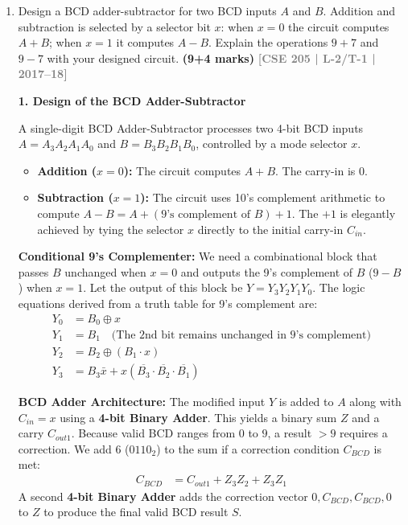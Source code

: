 \documentclass[12pt,a3paper]{article}
\newcommand{\yr}[1]{\hfill\textcolor{gray}{\small\textbf{[#1]}}}
\newcommand{\mk}[1]{\textcolor{orange!70!black}{\small\textbf{(#1 marks)}}}
\begin{document}
\begin{enumerate}
\item Design a BCD adder-subtractor for two BCD inputs $A$ and $B$. Addition and subtraction is selected by a selector bit $x$: when $x=0$ the circuit computes $A+B$; when $x=1$ it computes $A-B$. Explain the operations $9+7$ and $9-7$ with your designed circuit.
\mk{9+4} \yr{CSE 205 | L-2/T-1 | 2017--18}

\begin{tcolorbox}[enhanced,breakable,ansbox,colback=cD!4,colframe=cD,boxrule=0.8pt,arc=5pt,title={\textbf{Answer}},fonttitle=\bfseries\color{white},colbacktitle=cD]

\textbf{\textcolor{cD}{1. Design of the BCD Adder-Subtractor}}

A single-digit BCD Adder-Subtractor processes two 4-bit BCD inputs $A = A_3A_2A_1A_0$ and $B = B_3B_2B_1B_0$, controlled by a mode selector $x$. 
\begin{itemize}
    \item \textbf{Addition ($x = 0$):} The circuit computes $A + B$. The carry-in is $0$.
    \item \textbf{Subtraction ($x = 1$):} The circuit uses 10's complement arithmetic to compute $A - B = A + (\text{9's complement of } B) + 1$. The $+1$ is elegantly achieved by tying the selector $x$ directly to the initial carry-in $C_{in}$.
\end{itemize}

\textbf{Conditional 9's Complementer:}
We need a combinational block that passes $B$ unchanged when $x=0$ and outputs the 9's complement of $B$ ($9 - B$) when $x=1$. Let the output of this block be $Y = Y_3Y_2Y_1Y_0$. The logic equations derived from a truth table for 9's complement are:
\begin{align*}
    Y_0 &= B_0 \oplus x \\
    Y_1 &= B_1 \quad \text{(The 2nd bit remains unchanged in 9's complement)} \\
    Y_2 &= B_2 \oplus (B_1 \cdot x) \\
    Y_3 &= B_3\bar{x} + x(\overline{B_3} \cdot \overline{B_2} \cdot \overline{B_1})
\end{align*}

\textbf{BCD Adder Architecture:}
The modified input $Y$ is added to $A$ along with $C_{in} = x$ using a \textbf{4-bit Binary Adder}. This yields a binary sum $Z$ and a carry $C_{out1}$. Because valid BCD ranges from $0$ to $9$, a result $> 9$ requires a correction. We add $6$ ($0110_2$) to the sum if a correction condition $C_{BCD}$ is met:
\begin{align*}
    C_{BCD} &= C_{out1} + Z_3Z_2 + Z_3Z_1
\end{align*}
A second \textbf{4-bit Binary Adder} adds the correction vector $0, C_{BCD}, C_{BCD}, 0$ to $Z$ to produce the final valid BCD result $S$.


\end{tcolorbox}
\end{enumerate}
\end{document}
